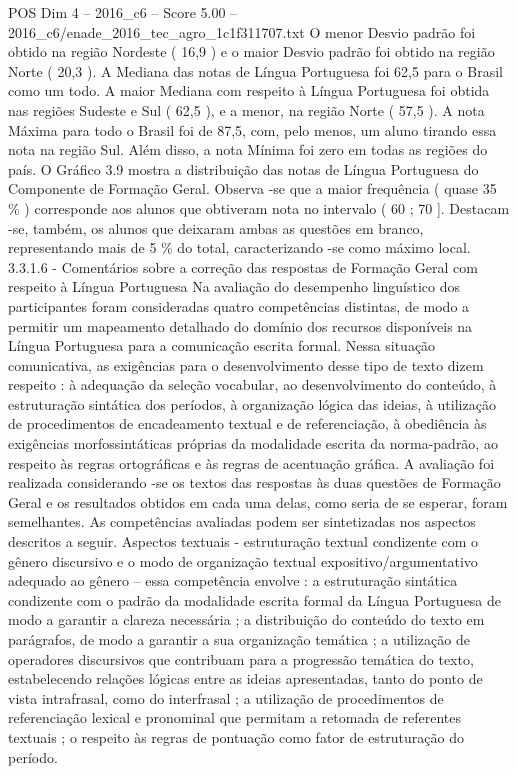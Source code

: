 \begin{textsample}{POS Dim 4 – 2016\_c6 – Score 5.00 – 2016\_c6/enade\_2016\_tec\_agro\_1c1f311707.txt}
O menor Desvio padrão foi obtido na região Nordeste ( 16,9 ) e o maior Desvio padrão foi obtido na região Norte ( 20,3 ).
A Mediana das notas de Língua Portuguesa foi 62,5 para o Brasil como um todo.
A maior Mediana com respeito à Língua Portuguesa foi obtida nas regiões Sudeste e Sul ( 62,5 ), e a menor, na região Norte ( 57,5 ).
A nota Máxima para todo o Brasil foi de 87,5, com, pelo menos, um aluno tirando essa nota na região Sul.
Além disso, a nota Mínima foi zero em todas as regiões do país.
O Gráfico 3.9 mostra a distribuição das notas de Língua Portuguesa do Componente de Formação Geral.
Observa -se que a maior frequência ( quase 35 \% ) corresponde aos alunos que obtiveram nota no intervalo ( 60 ; 70 ].
Destacam -se, também, os alunos que deixaram ambas as questões em branco, representando mais de 5 \% do total, caracterizando -se como máximo local. 3.3.1.6 - Comentários sobre a correção das respostas de Formação Geral com respeito à Língua Portuguesa Na avaliação do desempenho linguístico dos participantes foram consideradas quatro competências distintas, de modo a permitir um mapeamento detalhado do domínio dos recursos disponíveis na Língua Portuguesa para a comunicação escrita formal.
Nessa situação comunicativa, as exigências para o desenvolvimento desse tipo de texto dizem respeito : à adequação da seleção vocabular, ao desenvolvimento do conteúdo, à estruturação sintática dos períodos, à organização lógica das ideias, à utilização de procedimentos de encadeamento textual e de referenciação, à obediência às exigências morfossintáticas próprias da modalidade escrita da norma-padrão, ao respeito às regras ortográficas e às regras de acentuação gráfica.
A avaliação foi realizada considerando -se os textos das respostas às duas questões de Formação Geral e os resultados obtidos em cada uma delas, como seria de se esperar, foram semelhantes.
As competências avaliadas podem ser sintetizadas nos aspectos descritos a seguir.
Aspectos textuais - estruturação textual condizente com o gênero discursivo e o modo de organização textual expositivo/argumentativo adequado ao gênero – essa competência envolve : a estruturação sintática condizente com o padrão da modalidade escrita formal da Língua Portuguesa de modo a garantir a clareza necessária ; a distribuição do conteúdo do texto em parágrafos, de modo a garantir a sua organização temática ; a utilização de operadores discursivos que contribuam para a progressão temática do texto, estabelecendo relações lógicas entre as ideias apresentadas, tanto do ponto de vista intrafrasal, como do interfrasal ; a utilização de procedimentos de referenciação lexical e pronominal que permitam a retomada de referentes textuais ; o respeito às regras de pontuação como fator de estruturação do período.

\end{textsample}

